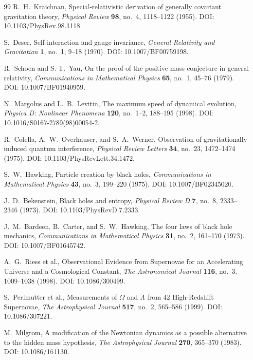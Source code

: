 \begin{thebibliography}{99}
R.~H.~Kraichnan, Special-relativistic derivation of generally covariant gravitation theory, \textit{Physical Review} \textbf{98}, no.~4, 1118--1122 (1955). DOI: 10.1103/PhysRev.98.1118.

S.~Deser, Self-interaction and gauge invariance, \textit{General Relativity and Gravitation} \textbf{1}, no.~1, 9--18 (1970). DOI: 10.1007/BF00759198.

R.~Schoen and S.-T.~Yau, On the proof of the positive mass conjecture in general relativity, \textit{Communications in Mathematical Physics} \textbf{65}, no.~1, 45--76 (1979). DOI: 10.1007/BF01940959.

N.~Margolus and L.~B.~Levitin, The maximum speed of dynamical evolution, \textit{Physica D: Nonlinear Phenomena} \textbf{120}, no.~1--2, 188--195 (1998). DOI: 10.1016/S0167-2789(98)00054-2.

R.~Colella, A.~W.~Overhauser, and S.~A.~Werner, Observation of gravitationally induced quantum interference, \textit{Physical Review Letters} \textbf{34}, no.~23, 1472--1474 (1975). DOI: 10.1103/PhysRevLett.34.1472.

S.~W.~Hawking, Particle creation by black holes, \textit{Communications in Mathematical Physics} \textbf{43}, no.~3, 199--220 (1975). DOI: 10.1007/BF02345020.

J.~D.~Bekenstein, Black holes and entropy, \textit{Physical Review D} \textbf{7}, no.~8, 2333--2346 (1973). DOI: 10.1103/PhysRevD.7.2333.

J.~M.~Bardeen, B.~Carter, and S.~W.~Hawking, The four laws of black hole mechanics, \textit{Communications in Mathematical Physics} \textbf{31}, no.~2, 161--170 (1973). DOI: 10.1007/BF01645742.

A.~G.~Riess et al., Observational Evidence from Supernovae for an Accelerating Universe and a Cosmological Constant, \textit{The Astronomical Journal} \textbf{116}, no.~3, 1009--1038 (1998). DOI: 10.1086/300499.

S.~Perlmutter et al., Measurements of $\Omega$ and $\Lambda$ from 42 High-Redshift Supernovae, \textit{The Astrophysical Journal} \textbf{517}, no.~2, 565--586 (1999). DOI: 10.1086/307221.

M.~Milgrom, A modification of the Newtonian dynamics as a possible alternative to the hidden mass hypothesis, \textit{The Astrophysical Journal} \textbf{270}, 365--370 (1983). DOI: 10.1086/161130.


\end{thebibliography}
